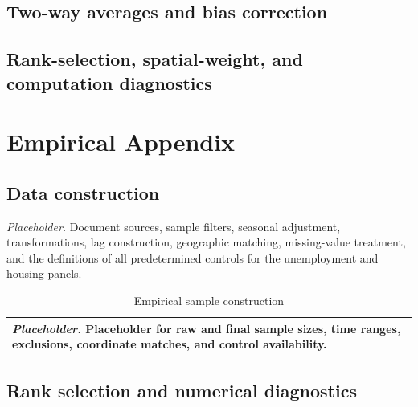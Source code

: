 \documentclass[11pt]{article}
\numberwithin{equation}{section}
\theoremstyle{remark}
\newcommand{\placeholdertable}[3]{%
\begin{table}[!htbp]
\centering
\caption{#1}
\label{#2}
\begin{tabular}{p{0.88\textwidth}}
\toprule
\textit{Placeholder.} #3\\
\bottomrule
\end{tabular}
\end{table}}
\begin{document}
\subsection{Two-way averages and bias correction}





\subsection{Rank-selection, spatial-weight, and computation diagnostics}



















\section{Empirical Appendix}
\label{app:empirical}

\subsection{Data construction}

\textit{Placeholder.} Document sources, sample filters, seasonal adjustment, transformations, lag construction, geographic matching, missing-value treatment, and the definitions of all predetermined controls for the unemployment and housing panels.

\placeholdertable{Empirical sample construction}{tab:app_emp_samples}{Placeholder for raw and final sample sizes, time ranges, exclusions, coordinate matches, and control availability.}

\subsection{Rank selection and numerical diagnostics}
\end{document}
